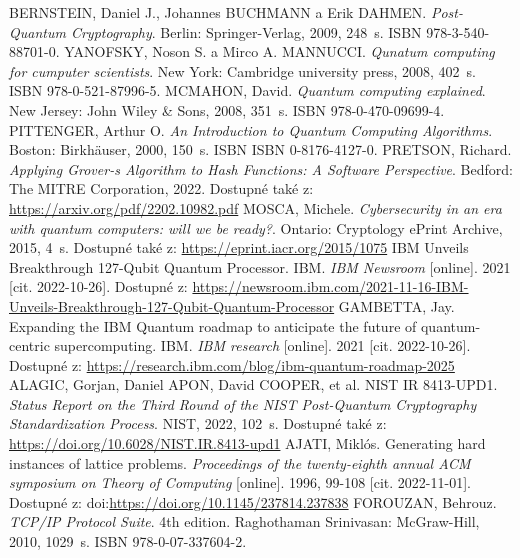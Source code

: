 \begin{thebibliography}{99}
  BERNSTEIN, Daniel J., Johannes BUCHMANN a Erik DAHMEN. \textit{Post-Quantum Cryptography}. Berlin: Springer-Verlag, 2009, 248~s. ISBN 978-3-540-88701-0.
  YANOFSKY, Noson S. a Mirco A. MANNUCCI. \textit{Qunatum computing for cumputer scientists}. New York: Cambridge university press, 2008, 402~s. ISBN 978-0-521-87996-5.
  MCMAHON, David. \textit{Quantum computing explained}. New Jersey: John Wiley \& Sons, 2008, 351~s. ISBN 978-0-470-09699-4. 
  PITTENGER, Arthur O. \textit{An Introduction to Quantum Computing Algorithms}. Boston: Birkhäuser, 2000, 150~s. ISBN ISBN 0-8176-4127-0.
  PRETSON, Richard. \textit{Applying Grover-s Algorithm to Hash Functions: A Software Perspective}. Bedford: The MITRE Corporation, 2022. Dostupné také z: \url{https://arxiv.org/pdf/2202.10982.pdf}
  MOSCA, Michele. \textit{Cybersecurity in an era with quantum computers: will we be ready?}. Ontario: Cryptology ePrint Archive, 2015, 4~s. Dostupné také z: \url{https://eprint.iacr.org/2015/1075}
  IBM Unveils Breakthrough 127-Qubit Quantum Processor. IBM. \textit{IBM Newsroom} [online]. 2021 [cit. 2022-10-26]. Dostupné z: \url{https://newsroom.ibm.com/2021-11-16-IBM-Unveils-Breakthrough-127-Qubit-Quantum-Processor}
  GAMBETTA, Jay. Expanding the IBM Quantum roadmap to anticipate the future of quantum-centric supercomputing. IBM. \textit{IBM research} [online]. 2021 [cit. 2022-10-26]. Dostupné z: \url{https://research.ibm.com/blog/ibm-quantum-roadmap-2025}
  ALAGIC, Gorjan, Daniel APON, David COOPER, et al. NIST IR 8413-UPD1. \textit{Status Report on the Third Round of the NIST Post-Quantum Cryptography Standardization Process}. NIST, 2022, 102~s. Dostupné také z: \url{https://doi.org/10.6028/NIST.IR.8413-upd1}
  AJATI, Miklós. Generating hard instances of lattice problems. \textit{Proceedings of the twenty-eighth annual ACM symposium on Theory of Computing} [online]. 1996, 99-108 [cit. 2022-11-01]. Dostupné z: doi:\url{https://doi.org/10.1145/237814.237838}
  FOROUZAN, Behrouz. \textit{TCP/IP Protocol Suite}. 4th edition. Raghothaman Srinivasan: McGraw-Hill, 2010, 1029~s. ISBN 978-0-07-337604-2.
  
\end{thebibliography}

% 
% 
%
